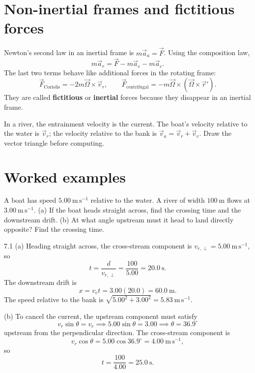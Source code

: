 \section{Non-inertial frames and fictitious forces}

Newton's second law in an inertial frame is $m\vec a_a=\vec F$. Using the
composition law,
\[
m\vec a_r=\vec F-m\vec a_e-m\vec a_c.
\]
The last two terms behave like additional forces in the rotating frame:
\[
\vec F_{\text{Coriolis}}=-2m\vec\Omega\times\vec v_r,\qquad
\vec F_{\text{centrifugal}}=-m\vec\Omega\times(\vec\Omega\times\vec r').
\]
They are called \textbf{fictitious} or \textbf{inertial} forces because they
disappear in an inertial frame.

\begin{keyidea}
In a river, the entrainment velocity is the current. The boat's velocity relative
to the water is $\vec v_r$; the velocity relative to the bank is
$\vec v_a=\vec v_r+\vec v_e$. Draw the vector triangle before computing.
\end{keyidea}

\section{Worked examples}

\begin{worked}
A boat has speed $5.00\ \mathrm{m\,s^{-1}}$ relative to the water. A river of
width $100\ \mathrm{m}$ flows at $3.00\ \mathrm{m\,s^{-1}}$.
(a) If the boat heads straight across, find the crossing time and the downstream
drift.
(b) At what angle upstream must it head to land directly opposite? Find the
crossing time.
\end{worked}

\begin{solution}{7.1}
(a) Heading straight across, the cross-stream component is
$v_{r,\perp}=5.00\ \mathrm{m\,s^{-1}}$, so
\[
t=\frac{d}{v_{r,\perp}}=\frac{100}{5.00}=20.0\ \mathrm{s}.
\]
The downstream drift is
\[
x=v_e t=3.00(20.0)=60.0\ \mathrm{m}.
\]
The speed relative to the bank is
$\sqrt{5.00^2+3.00^2}=5.83\ \mathrm{m\,s^{-1}}$.

(b) To cancel the current, the upstream component must satisfy
\[
v_r\sin\theta=v_e
\implies
5.00\sin\theta=3.00
\implies
\theta=36.9^\circ
\]
upstream from the perpendicular direction. The cross-stream component is
\[
v_r\cos\theta=5.00\cos36.9^\circ=4.00\ \mathrm{m\,s^{-1}},
\]
so
\[
t=\frac{100}{4.00}=25.0\ \mathrm{s}.
\]
\end{solution}

